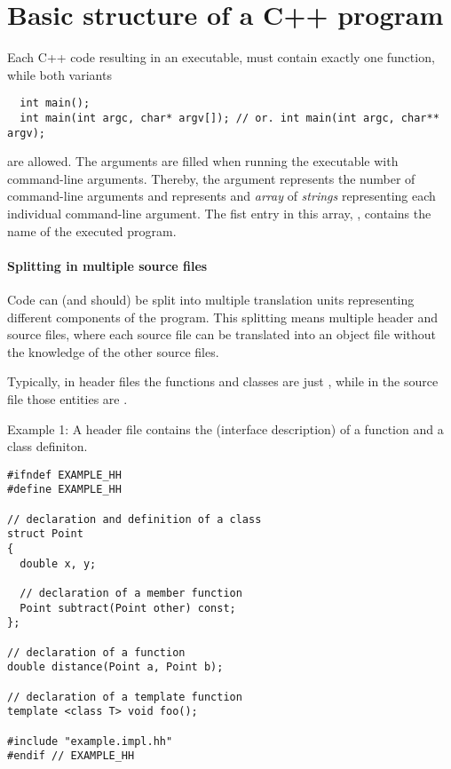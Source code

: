 \section{Basic structure of a C++ program\label{sec:code-structure}}
Each C++ code resulting in an executable, must contain exactly one  function, while both variants
%
\begin{verbatim}
  int main();
  int main(int argc, char* argv[]); // or. int main(int argc, char** argv);
\end{verbatim}
%
are allowed. The arguments  are filled when running the executable with command-line arguments. Thereby, the argument 
represents the number of command-line arguments and  represents and \textit{array} of \textit{strings} representing each individual
command-line argument. The fist entry in this array, , contains the name of the executed program.

\paragraph{Splitting in multiple source files}
Code can (and should) be split into multiple translation units representing different components of the program. This splitting means multiple
header and source files, where each source file can be translated into an object file without the knowledge of the other source files.

Typically, in header files the functions and classes are just , while in the source file those entities are .

Example 1: A header file contains the  (interface description) of a function and a class definiton.
\begin{verbatim}
#ifndef EXAMPLE_HH
#define EXAMPLE_HH

// declaration and definition of a class
struct Point
{
  double x, y;

  // declaration of a member function
  Point subtract(Point other) const;
};

// declaration of a function
double distance(Point a, Point b);

// declaration of a template function
template <class T> void foo();

#include "example.impl.hh"
#endif // EXAMPLE_HH
\end{verbatim}


